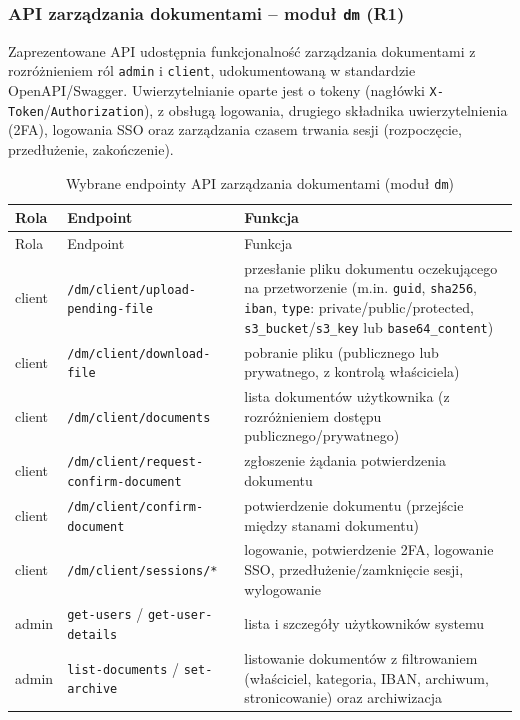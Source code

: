 \subsubsection*{API zarządzania dokumentami -- moduł \texttt{dm} (R1)}

Zaprezentowane API udostępnia funkcjonalność zarządzania dokumentami z rozróżnieniem ról \texttt{admin} i \texttt{client}, udokumentowaną w standardzie OpenAPI/Swagger. Uwierzytelnianie oparte jest o tokeny (nagłówki \texttt{X-Token}/\texttt{Authorization}), z obsługą logowania, drugiego składnika uwierzytelnienia (2FA), logowania SSO oraz zarządzania czasem trwania sesji (rozpoczęcie, przedłużenie, zakończenie).

\begingroup
\small
\begin{longtable}{p{} p{} p{}}
\caption{Wybrane endpointy API zarządzania dokumentami (moduł \texttt{dm})} \\
\toprule
\rowcolor{tablehead!15}
Rola & Endpoint & Funkcja \\
\midrule
\endfirsthead
\toprule
\rowcolor{tablehead!15}
Rola & Endpoint & Funkcja \\
\midrule
\endhead
client & \texttt{/dm/client/\allowbreak upload-pending-file} & przesłanie pliku dokumentu oczekującego na przetworzenie (m.in. \texttt{guid}, \texttt{sha256}, \texttt{iban}, \texttt{type}: private/public/protected, \texttt{s3\_bucket}/\texttt{s3\_key} lub \texttt{base64\_content}) \\
client & \texttt{/dm/client/\allowbreak download-file} & pobranie pliku (publicznego lub prywatnego, z kontrolą właściciela) \\
client & \texttt{/dm/client/\allowbreak documents} & lista dokumentów użytkownika (z rozróżnieniem dostępu publicznego/prywatnego) \\
client & \texttt{/dm/client/\allowbreak request-confirm-document} & zgłoszenie żądania potwierdzenia dokumentu \\
client & \texttt{/dm/client/\allowbreak confirm-document} & potwierdzenie dokumentu (przejście między stanami dokumentu) \\
client & \texttt{/dm/client/\allowbreak sessions/*} & logowanie, potwierdzenie 2FA, logowanie SSO, przedłużenie/zamknięcie sesji, wylogowanie \\
admin & \texttt{get-users} / \texttt{get-user-\allowbreak details} & lista i szczegóły użytkowników systemu \\
admin & \texttt{list-documents} / \texttt{set-\allowbreak archive} & listowanie dokumentów z filtrowaniem (właściciel, kategoria, IBAN, archiwum, stronicowanie) oraz archiwizacja \\

\end{longtable}

